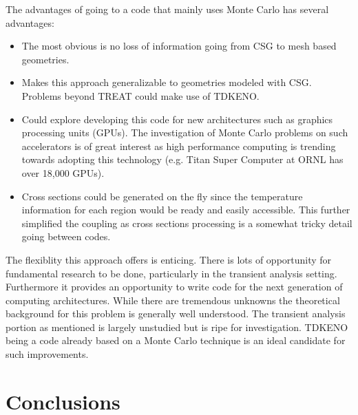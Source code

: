 \documentclass[11pt]{article}
\begin{document}
The advantages of going to a code that mainly uses Monte Carlo  has several advantages:
	\begin{itemize}
	\item The most obvious is no loss of information going from CSG to mesh based geometries. 
	\item Makes this approach generalizable to geometries modeled with CSG. Problems beyond TREAT could make use of TDKENO.  
	\item Could explore developing this code for new architectures such as graphics processing units (GPUs).  The investigation of Monte Carlo problems on such accelerators is of great interest as  high performance computing is trending towards adopting this technology (e.g. Titan Super Computer at ORNL has over 18,000 GPUs). 
	\item Cross sections could be generated on the fly since the temperature information for each region would be ready and easily accessible.  This further simplified the coupling as cross sections processing is a somewhat tricky detail going between codes. 
	\end{itemize}

The flexiblity this approach offers is enticing.  There is lots of opportunity for fundamental research to be done, particularly in the transient analysis setting.  Furthermore it provides an opportunity to write code for the next generation of computing architectures.  While there are tremendous unknowns the theoretical background for this problem is generally well understood. The transient analysis portion as mentioned is largely unstudied but is ripe for investigation.  TDKENO being a code already based on a Monte Carlo technique is an ideal candidate for such  improvements. 


\section{Conclusions}



\end{document}
